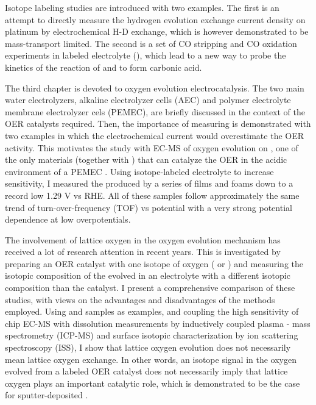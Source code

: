 \begin{adjustwidth}{1cm}{1cm}
Isotope labeling studies are introduced with two examples. The first is an attempt to directly measure the hydrogen evolution exchange current density on platinum by electrochemical H-D exchange, which is however demonstrated to be mass-transport limited. The second is a set of CO stripping and CO oxidation experiments in labeled electrolyte (), which lead to a new way to probe the kinetics of the reaction of  and  to form carbonic acid. 

The third chapter is devoted to oxygen evolution electrocatalysis. The two main water electrolyzers, alkaline electrolyzer cells (AEC) and polymer electrolyte membrane electrolyzer cels (PEMEC), are briefly discussed in the context of the OER catalysts required. Then, the importance of measuring  is demonstrated with two examples in which the electrochemical current would overestimate the OER activity. This motivates the study with EC-MS of oxygen evolution on , one of the only materials (together with ) that can catalyze the OER in the acidic environment of a PEMEC
.
Using isotope-labeled electrolyte to increase sensitivity, I measured the  produced by a series of  films and  foams down to a record low 1.29 V vs RHE. All of these samples follow approximately the same trend of turn-over-frequency (TOF) vs potential with a very strong potential dependence at low overpotentials.

The involvement of lattice oxygen in the oxygen evolution mechanism has received a lot of research attention in recent years. This is investigated by preparing an OER catalyst with one isotope of oxygen ( or ) and measuring the isotopic composition of the  evolved in an electrolyte with a different isotopic composition than the catalyst. I present a comprehensive comparison of these studies, with views on the advantages and disadvantages of the methods employed. Using  and  samples as examples, and coupling the high sensitivity of chip EC-MS with dissolution measurements by inductively coupled plasma - mass spectrometry (ICP-MS) and surface isotopic characterization by ion scattering spectroscopy (ISS), I show that lattice oxygen evolution does not necessarily mean lattice oxygen exchange. In other words, an isotope signal in the oxygen evolved from a labeled OER catalyst does not necessarily imply that lattice oxygen plays an important catalytic role, which is demonstrated to be the case for sputter-deposited . 


\end{adjustwidth}
